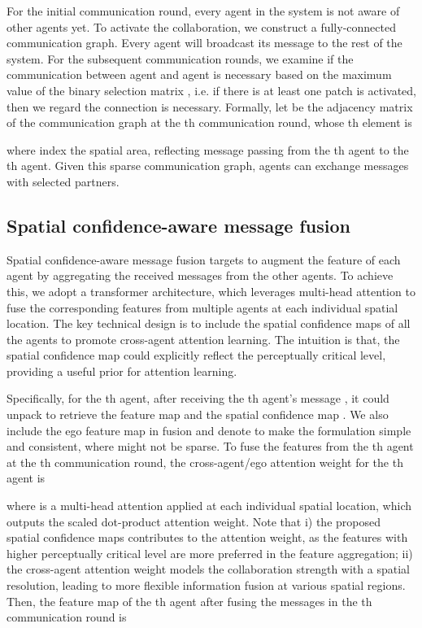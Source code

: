 \documentclass{article}
\begin{document}
For the initial communication round, every agent in the system is not aware of other agents yet. To activate the collaboration, we construct a fully-connected communication graph. Every agent will broadcast its message to the rest of the system. For the subsequent communication rounds, we examine if the communication between agent  and agent  is necessary based on the maximum value of the binary selection matrix , i.e. if there is at least one patch is activated, then we regard the connection is necessary. Formally, let  be the adjacency matrix of the communication graph at the th communication round, whose th element is \vspace{-1mm}

where  index the spatial area, reflecting message passing from the th agent to the th agent.  Given this sparse communication graph, agents can exchange messages with selected partners.



\vspace{-2mm}
\subsection{Spatial confidence-aware message fusion}
\label{sec:Fusion}
\vspace{-2mm}
Spatial confidence-aware message fusion targets to augment the feature of each agent by aggregating the received messages from the other agents. To achieve this, we adopt a transformer architecture, which leverages multi-head attention to fuse the corresponding features from multiple agents at each individual spatial location. The key technical design is to include the spatial confidence maps of all the agents to promote cross-agent attention learning. The intuition is that, the spatial confidence map could explicitly reflect the perceptually critical level, providing a useful prior for attention learning.

Specifically, for the th agent, after receiving the th agent's message , it could unpack to retrieve the feature map  and the spatial confidence map . We also include the ego feature map in fusion and denote  to make the formulation simple and consistent, where  might not be sparse. To fuse the features from the th agent at the th communication round, the cross-agent/ego attention weight for the th agent is

where  is a multi-head attention applied at each individual spatial location, which outputs the scaled dot-product attention weight. Note that i) the proposed spatial confidence maps contributes to the attention weight, as the features with higher perceptually critical level are more preferred in the feature aggregation; ii) the cross-agent attention weight models the collaboration strength with a  spatial resolution, leading to more flexible information fusion at various spatial regions. Then, the feature map of the th agent after fusing the messages in the th communication round is
\end{document}
